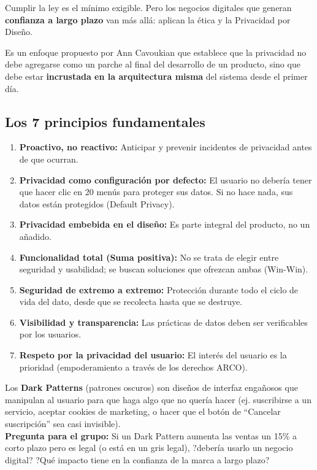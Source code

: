 \documentclass[12pt,a4paper]{article}
\begin{document}
Cumplir la ley es el m\'inimo exigible. Pero los negocios digitales que generan \textbf{confianza a largo plazo} van m\'as all\'a: aplican la \'etica y la Privacidad por Dise\~no.

\begin{cajaEtica}[title={?Qu\'e es Privacidad por Dise\~no?}]
Es un enfoque propuesto por Ann Cavoukian que establece que la privacidad no debe agregarse como un parche al final del desarrollo de un producto, sino que debe estar \textbf{incrustada en la arquitectura misma} del sistema desde el primer d\'ia.
\end{cajaEtica}

\subsection{Los 7 principios fundamentales}
\begin{enumerate}[leftmargin=2em]
    \item \textbf{Proactivo, no reactivo:} Anticipar y prevenir incidentes de privacidad antes de que ocurran.
    \item \textbf{Privacidad como configuraci\'on por defecto:} El usuario no deber\'ia tener que hacer clic en 20 men\'us para proteger sus datos. Si no hace nada, sus datos est\'an protegidos (Default Privacy).
    \item \textbf{Privacidad embebida en el dise\~no:} Es parte integral del producto, no un a\~nadido.
    \item \textbf{Funcionalidad total (Suma positiva):} No se trata de elegir entre seguridad y usabilidad; se buscan soluciones que ofrezcan ambas (Win-Win).
    \item \textbf{Seguridad de extremo a extremo:} Protecci\'on durante todo el ciclo de vida del dato, desde que se recolecta hasta que se destruye.
    \item \textbf{Visibilidad y transparencia:} Las pr\'acticas de datos deben ser verificables por los usuarios.
    \item \textbf{Respeto por la privacidad del usuario:} El inter\'es del usuario es la prioridad (empoderamiento a trav\'es de los derechos ARCO).
\end{enumerate}

\begin{cajaActividad}[title={Reflexi\'on \'Etica: Dark Patterns}]
Los \textbf{Dark Patterns} (patrones oscuros) son dise\~nos de interfaz enga\~nosos que manipulan al usuario para que haga algo que no quer\'ia hacer (ej. suscribirse a un servicio, aceptar cookies de marketing, o hacer que el bot\'on de ``Cancelar suscripci\'on'' sea casi invisible).\\[6pt]
\textbf{Pregunta para el grupo:} Si un Dark Pattern aumenta las ventas un 15\% a corto plazo pero es legal (o est\'a en un gris legal), ?deber\'ia usarlo un negocio digital? ?Qu\'e impacto tiene en la confianza de la marca a largo plazo?
\end{cajaActividad}
\end{document}
